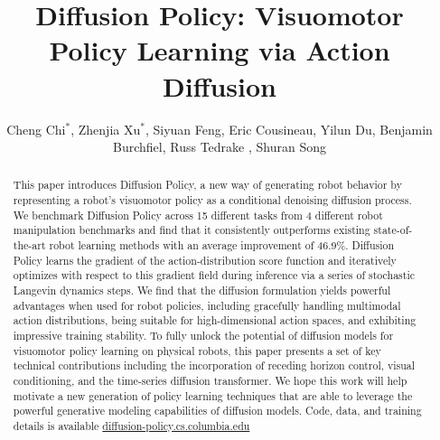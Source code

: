\documentclass[Afour,sageh,times]{sagej}
\begin{document}

\title{Diffusion Policy: Visuomotor Policy Learning via Action Diffusion}

\author{Cheng Chi$^{*}$, Zhenjia Xu$^{*}$, Siyuan Feng, Eric Cousineau, Yilun Du,  Benjamin Burchfiel, Russ Tedrake , Shuran Song}




\begin{abstract} This paper introduces Diffusion Policy, a new way of generating robot behavior by representing a robot's visuomotor policy as a conditional denoising diffusion process. We benchmark Diffusion Policy across 15 different tasks from 4 different robot manipulation benchmarks and find that it consistently outperforms existing state-of-the-art robot learning methods with an average improvement of 46.9\%. 
Diffusion Policy learns the gradient of the action-distribution score function and iteratively optimizes with respect to this gradient field during inference via a series of stochastic Langevin dynamics steps.
We find that the diffusion formulation yields powerful advantages when used for robot policies, including gracefully handling multimodal action distributions, being suitable for high-dimensional action spaces, and exhibiting impressive training stability.
To fully unlock the potential of diffusion models for visuomotor policy learning on physical robots, this paper presents a set of key technical contributions including the incorporation of receding horizon control, visual conditioning, and the time-series diffusion transformer. 
We hope this work will help motivate a new generation of policy learning techniques that are able to leverage the powerful generative modeling capabilities of diffusion models. Code, data, and training details is available \url{diffusion-policy.cs.columbia.edu}
\end{abstract}
\end{document}
